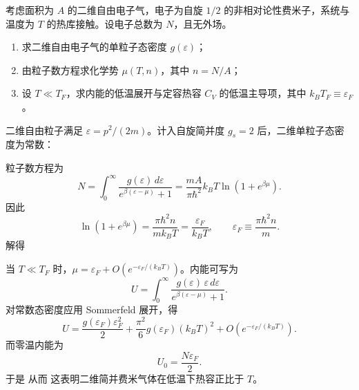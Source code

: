 \begin{question}
考虑面积为 $A$ 的二维自由电子气，电子为自旋 $1/2$ 的非相对论性费米子，系统与温度为 $T$ 的热库接触。设电子总数为 $N$，且无外场。

\begin{enumerate}[label=(\arabic*),leftmargin=2.5em]
  \item 求二维自由电子气的单粒子态密度 $g(\varepsilon)$；
  \item 由粒子数方程求化学势 $\mu(T,n)$，其中 $n=N/A$；
  \item 设 $T\ll T_F$，求内能的低温展开与定容热容 $C_V$ 的低温主导项，其中 $k_B T_F\equiv \varepsilon_F$。
\end{enumerate}

\begin{solution}
二维自由粒子满足 $\varepsilon=p^2/(2m)$。计入自旋简并度 $g_s=2$ 后，二维单粒子态密度为常数：

粒子数方程为
\[
N=\int_0^\infty \frac{g(\varepsilon)\,d\varepsilon}{e^{\beta(\varepsilon-\mu)}+1}
=\frac{mA}{\pi\hbar^2}k_B T\ln\left(1+e^{\beta\mu}\right).
\]
因此
\[
\ln(1+e^{\beta\mu})=\frac{\pi\hbar^2 n}{m k_B T}=\frac{\varepsilon_F}{k_B T},
\qquad
\varepsilon_F\equiv \frac{\pi\hbar^2 n}{m}.
\]
解得

当 $T\ll T_F$ 时，$\mu=\varepsilon_F+O(e^{-\varepsilon_F/(k_B T)})$。内能可写为
\[
U=\int_0^\infty \frac{g(\varepsilon)\,\varepsilon\,d\varepsilon}{e^{\beta(\varepsilon-\mu)}+1}.
\]
对常数态密度应用 Sommerfeld 展开，得
\[
U=\frac{g(\varepsilon_F)\varepsilon_F^2}{2}+\frac{\pi^2}{6}g(\varepsilon_F)(k_B T)^2+O\!\left(e^{-\varepsilon_F/(k_B T)}\right).
\]
而零温内能为
\[
U_0=\frac{N\varepsilon_F}{2}.
\]
于是
从而
这表明二维简并费米气体在低温下热容正比于 $T$。
\end{solution}
\end{question}

